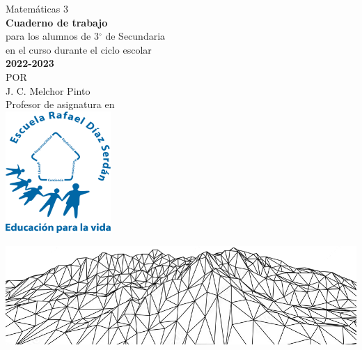 \thispagestyle{empty}
\begin{center}
    \vspace{4cm}
    {\Huge Matem\'aticas 3}\\
    \vspace{1cm}
    \normalsize
    \textbf{\large Cuaderno de trabajo}\\
    para los alumnos de 3$^\circ$ de  Secundaria\\
    en el curso durante el ciclo escolar\\
    \textbf{2022-2023}\\
    \vspace{2cm}
    \small POR\\
    \Large J. C. Melchor Pinto\\[0.5em]
    \normalsize Profesor de asignatura en\\
    \vspace{2cm}
    \includegraphics[width=4cm]{../Images/LOGO_RDS_nobg}\\
    \vspace{1.8cm}
\end{center}
\includegraphics[width=1\textwidth]{../Images/cover_bg}